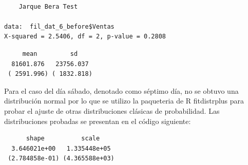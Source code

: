 \documentclass[
  us-letterpaper,
]{scrreprt}
\newenvironment{Shaded}{\begin{snugshade}}{\end{snugshade}}
\newcommand{\CommentTok}[1]{\textcolor[rgb]{0.37,0.37,0.37}{#1}}
\newcommand{\FunctionTok}[1]{\textcolor[rgb]{0.28,0.35,0.67}{#1}}
\newcommand{\NormalTok}[1]{\textcolor[rgb]{0.00,0.23,0.31}{#1}}
\newcommand{\SpecialCharTok}[1]{\textcolor[rgb]{0.37,0.37,0.37}{#1}}
\newcommand{\StringTok}[1]{\textcolor[rgb]{0.13,0.47,0.30}{#1}}
\theoremstyle{definition}
\theoremstyle{plain}
\theoremstyle{plain}
\theoremstyle{remark}
\begin{document}
\begin{verbatim}

    Jarque Bera Test

data:  fil_dat_6_before$Ventas
X-squared = 2.5406, df = 2, p-value = 0.2808
\end{verbatim}

\begin{Shaded}
\end{Shaded}

\begin{verbatim}
     mean         sd    
  81601.876   23756.037 
 ( 2591.996) ( 1832.818)
\end{verbatim}

Para el caso del día sábado, denotado como séptimo día, no se obtuvo una
distribución normal por lo que se utilizo la paqueteria de R
fitdistrplus para probar el ajuste de otras distribuciones clásicas de
probabilidad. Las distribuciones probadas se presentan en el código
siguiente:

\begin{Shaded}
\end{Shaded}

\begin{verbatim}
      shape          scale    
  3.646021e+00   1.335448e+05 
 (2.784858e-01) (4.365588e+03)
\end{verbatim}

\begin{Shaded}
\end{Shaded}
\end{document}

